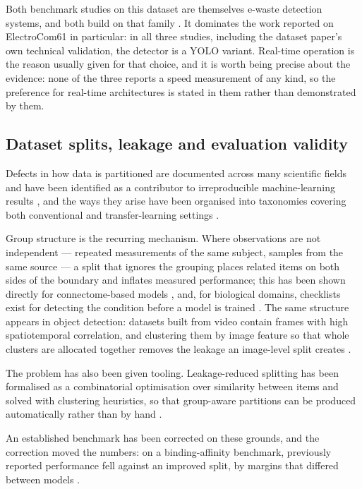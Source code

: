 Both benchmark studies on this dataset are themselves e-waste detection systems,
and both build on that family \citep{yolov12paper,yolov13paper}. It dominates
the work reported on ElectroCom61 in particular: in all three studies,
including the dataset paper's own technical validation, the detector is a YOLO
variant.
Real-time operation is the reason usually given for that choice, and it is worth
being precise about the evidence: none of the three reports a speed measurement
of any kind, so the preference for real-time architectures is stated in them
rather than demonstrated by them.

\subsection{Dataset splits, leakage and evaluation validity}
\label{sec:related-leakage}

Defects in how data is partitioned are documented across many scientific fields
and have been identified as a contributor to irreproducible machine-learning
results \citep{kapoor2023leakage}, and the ways they arise have been organised
into taxonomies covering both conventional and transfer-learning settings
\citep{apicella2025leakage}.

Group structure is the recurring mechanism. Where observations are not
independent --- repeated measurements of the same subject, samples from the same
source --- a split that ignores the grouping places related items on both sides
of the boundary and inflates measured performance; this has been shown directly
for connectome-based models \citep{rosenblatt2024leakage}, and, for biological
domains, checklists exist for detecting the condition before a model is trained
\citep{bernett2024guiding}. The same structure appears in object detection:
datasets built from video contain frames with high spatiotemporal correlation,
and clustering them by image feature so that whole clusters are allocated
together removes the leakage an image-level split creates
\citep{figueiredo2024leakage}.

The problem has also been given tooling. Leakage-reduced splitting has been
formalised as a combinatorial optimisation over similarity between items and
solved with clustering heuristics, so that group-aware partitions can be
produced automatically rather than by hand \citep{joeres2025datasail}.

An established benchmark has been corrected on these grounds, and the correction
moved the numbers: on a binding-affinity benchmark, previously reported
performance fell against an improved split, by margins that differed between
models \citep{graber2025resolving}.

